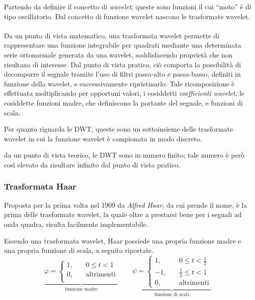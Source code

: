 \documentclass{subfiles}
\begin{document}
Partendo da definire il concetto di \emph{wavelet}; queste sono funzioni il cui ``moto'' è di tipo oscillatorio.
Dal concetto di funzione wavelet nascono le trasformate wavelet.
\\ \\
Da un punto di vista matematico, una trasformata wavelet permette di rappresentare una funzione integrabile per quadrati mediante una determinata serie ortonormale generata da una wavelet,
soddisfacendo proprietà che non risultano di interesse. Dal punto di vista pratico, ciò comporta la possibilità di decomporre il segnale tramite l'uso di filtri passa-alto e passa-basso,
definiti in funzione della wavelet, e successivamente ripristinarlo. Tale ricomposizione è effettuata moltiplicando per opportuni valori, i cosiddetti \emph{coefficienti wavelet},
le cosiddette funzioni madre, che definiscono la portante del segnale, e funzioni di scala.

Per quanto riguarda le DWT, queste sono un sottoinsieme delle trasformate wavelet in cui la funzione wavelet è campionata in modo discreto.

\begin{Note*}
    da un punto di vista teorico, le DWT sono in numero finito; tale numero è però così elevato da risultare infinito dal punto di vista pratico.
\end{Note*}

\subsubsection{Trasformata Haar}
Proposta per la prima volta nel 1909 da \emph{Alfred Haar}, da cui prende il nome, è la prima delle trasformate wavelet, la quale oltre a prestarsi bene per i segnali ad onda quadra,
risulta facilmente implementabile.

Essendo una trasformata wavelet, Haar possiede una propria funzione madre e una propria funzione di scala, a seguito riportate.
\[\underbrace{\varphi = \begin{cases}
            1, & \quad 0 \le t < 1       \\
            0, & \quad \text{altrimenti} \\
        \end{cases}}_{\text{funzione madre}} \qquad \underbrace{\psi = \begin{cases}
            1,  & \quad 0 \le t < \frac{1}{2} \\
            -1, & \quad \frac{1}{2} \le t < 1 \\
            0,  & \quad \text{altrimenti}
        \end{cases}}_{\text{funzione di scala}}\]
\end{document}
